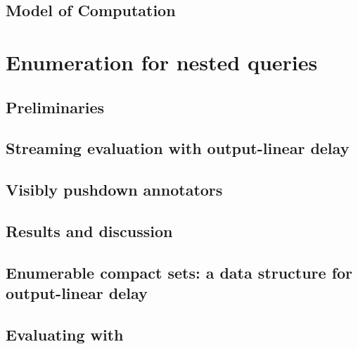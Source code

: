 \documentclass[pdftex]{pucthesis}	%
\begin{document}


\section{Model of Computation}




\chapter[ENUMERATION FOR NESTED QUERIES]{Enumeration for nested queries} \label{ch1}

\label{nested:sec:intro}


\section{Preliminaries}\label{nested:sec:prelim}


\section{Streaming evaluation with output-linear delay}\label{nested:sec:enum}


\section{Visibly pushdown annotators}\label{nested:sec:vpann}


\section{Results and discussion}\label{nested:sec:results}


\section{Enumerable compact sets: a data structure for output-linear delay}\label{nested:sec:ds}


\section{Evaluating \vpannnames with \lindelay}\label{nested:sec:eval}

\end{document}

